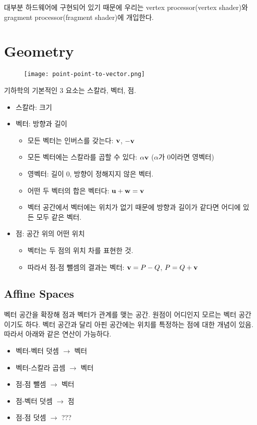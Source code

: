 대부분 하드웨어에 구현되어 있기 때문에 우리는 vertex processor(vertex shader)와 gragment processor(fragment shader)에 개입한다.

\section{Geometry}

\begin{figure}[h]
  \centering
  \texttt{[image: point-point-to-vector.png]}
\end{figure}

기하학의 기본적인 3 요소는 스칼라, 벡터, 점.

\begin{itemize}
  \item 스칼라: 크기
  \item 벡터: 방향과 길이
    \begin{itemize}
      \item 모든 벡터는 인버스를 갖는다: $\bold{v}$, $-\bold{v}$
      \item 모든 벡터에는 스칼라를 곱할 수 있다: $\alpha \bold{v}$ ($\alpha$가 0이라면 영벡터)
      \item 영벡터: 길이 0, 방향이 정해지지 않은 벡터.
      \item 어떤 두 벡터의 합은 벡터다: $\bold{u} + \bold{w} = \bold{v}$
      \item 벡터 공간에서 벡터에는 위치가 없기 때문에 방향과 길이가 같다면 어디에 있든 모두 같은 벡터.
    \end{itemize}
  \item 점: 공간 위의 어떤 위치
    \begin{itemize}
      \item 벡터는 두 점의 위치 차를 표현한 것.
      \item 따라서 점-점 뺄셈의 결과는 벡터: $\bold{v} = P - Q$, $P = Q + \bold{v}$
    \end{itemize}
\end{itemize}

\subsection{Affine Spaces}

벡터 공간을 확장해 점과 벡터가 관계를 맺는 공간. 원점이 어디인지 모르는 벡터 공간이기도 하다. 벡터 공간과 달리 아핀 공간에는 위치를 특정하는 점에 대한 개념이 있음. 따라서 아래와 같은 연산이 가능하다.

\begin{itemize}
  \item 벡터-벡터 덧셈 $\rightarrow$ 벡터
  \item 벡터-스칼라 곱셈 $\rightarrow$ 벡터
  \item 점-점 뺄셈 $\rightarrow$ 벡터
  \item 점-벡터 덧셈 $\rightarrow$ 점
  \item 점-점 덧셈 $\rightarrow$ ???
\end{itemize}


